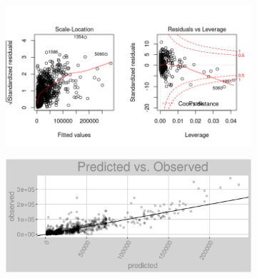 \begin{figure}[h]
\centering
\begin{subfigure}{1\textwidth}
\centering
\includegraphics[width=.99\textwidth, height=0.475\textheight]{Images/electricity_rfe_res_2.png}
\end{subfigure}
\begin{subfigure}{1\textwidth}
\centering
\includegraphics[width=.99\textwidth, height=0.3\textheight]{Images/electricity_rfe_pvo.png}
\end{subfigure}
\end{figure}
\FloatBarrier
\newpage

